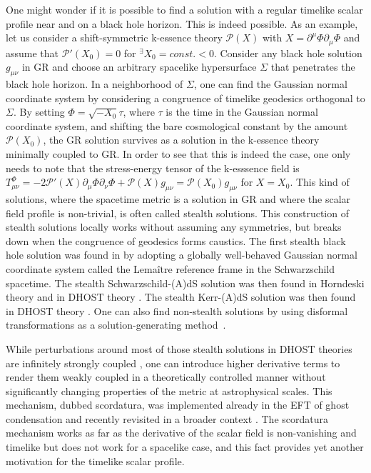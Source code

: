 \documentclass[a4paper,11pt]{article}
\numberwithin{equation}{section}
\begin{document}
One might wonder if it is possible to find a solution with a regular timelike scalar profile near and on a black hole horizon. This is indeed possible. As an example, let us consider a shift-symmetric k-essence theory $\mathcal{P}(X)$ with $X=\partial^{\mu}\Phi\partial_{\mu}\Phi$ and assume that $\mathcal{P}'(X_0)=0$ for ${}^{\exists} X_0 = const. < 0$. Consider any black hole solution $g_{\mu\nu}$ in GR and choose an arbitrary spacelike hypersurface $\Sigma$ that penetrates the black hole horizon. In a neighborhood of $\Sigma$, one can find the Gaussian normal coordinate system by considering a congruence of timelike geodesics orthogonal to $\Sigma$. By setting $\Phi=\sqrt{-X_0}\tau$, where $\tau$ is the time in the Gaussian normal coordinate system, and shifting the bare cosmological constant by the amount $\mathcal{P}(X_0)$, the GR solution survives as a solution in the k-essence theory minimally coupled to GR. In order to see that this is indeed the case, one only needs to note that the stress-energy tensor of the k-esssence field is $T^{\Phi}_{\mu\nu} = -2\mathcal{P}'(X) \partial_{\mu}\Phi \partial_{\nu}\Phi + \mathcal{P}(X) g_{\mu\nu} = \mathcal{P}(X_0)g_{\mu\nu}$ for $X=X_0$. This kind of solutions, where the spacetime metric is a solution in GR and where the scalar field profile is non-trivial, is often called stealth solutions. This construction of stealth solutions locally works without assuming any symmetries, but breaks down when the congruence of geodesics forms caustics. The first stealth black hole solution was found in \cite{Mukohyama:2005rw} by adopting a globally well-behaved Gaussian normal coordinate system called the Lema\^{i}tre reference frame in the Schwarzschild spacetime. The stealth Schwarzschild-(A)dS solution was then found in Horndeski theory \cite{Babichev:2013cya,Kobayashi:2014eva} and in DHOST theory \cite{BenAchour:2018dap,Motohashi:2019sen}. The stealth Kerr-(A)dS solution was then found in DHOST theory \cite{Charmousis:2019vnf}. One can also find non-stealth solutions by using disformal transformations as a solution-generating method~\cite{BenAchour:2020wiw,BenAchour:2020fgy,Anson:2020trg}. 

While perturbations around most of those stealth solutions in DHOST theories are infinitely strongly coupled \cite{deRham:2019gha}, one can introduce higher derivative terms to render them weakly coupled in a theoretically controlled manner without significantly changing properties of the metric at astrophysical scales. This mechanism, dubbed scordatura, was implemented already in the EFT of ghost condensation \cite{ArkaniHamed:2003uy,Mukohyama:2005rw} and recently revisited in a broader context \cite{Motohashi:2019ymr,Gorji:2020bfl,Gorji:2021isn}. The scordatura mechanism works as far as the derivative of the scalar field is non-vanishing and timelike but does not work for a spacelike case, and this fact provides yet another motivation for the timelike scalar profile. 
\end{document}
